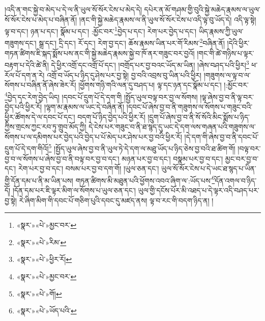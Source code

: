 །འདི་ན་གང་སྐྱེ་བ་མེད་པ་དེ་ལ་ནི་ཡུལ་སོ་སོར་ངེས་པ་མེད་དེ། དཔེར་ན་མོ་གཤམ་གྱི་བུའི་སྐྱེ་མཆེད་རྣམས་ལ་ཡུལ་སོ་སོར་ངེས་པ་མེད་པ་བཞིན་ནོ། །ནང་གི་སྐྱེ་མཆེད་རྣམས་ལ་ནི་ཡུལ་སོ་སོར་ངེས་པ་འདི་ལྟ་བུ་ཡོད་དེ། འདི་ལྟ་སྟེ། ལྟ་བ་དང་། ཉན་པ་དང་། སྣོམ་པ་དང་། :མྱོང་བར་\footnote{«སྣར་»«པེ་»མྱང་བར་}བྱེད་པ་དང་། རེག་པར་བྱེད་པ་དང་། ཡིད་རྣམས་ཀྱི་ཡུལ་གཟུགས་དང་། སྒྲ་དང་། དྲི་དང་། རོ་དང་། རེག་བྱ་དང་། ཆོས་རྣམས་ཡིན་པར་གོ་རིམས་\footnote{«སྣར་»«པེ་»རིམ་}བཞིན་ནོ། །དེའི་ཕྱིར་གཏན་ཚིགས་ཇི་སྐད་སྨོས་པས་ནང་གི་སྐྱེ་མཆེད་རྣམས་སྐྱེ་བ་ཁོ་ནར་གཟུང་བར་བྱའོ། །གང་གི་ཚེ་གཉིས་པ་ལྟར་བརྟག་པ་དེའི་ཚེ་ནི། དེ་ཕྱིར་འགྲོ་དང་འགྲོ་པོ་དང་། །བགྲོད་པར་བྱ་བའང་ཡོད་མ་ཡིན། །ཞེས་བཤད་པའི་ཕྱིར།\footnote{«སྣར་»«པེ་»ཕྱིར་རོ།} ཕ་རོལ་པོ་དག་ན་རེ། འགྲོ་བ་ཡོད་པ་ཉིད་དུ་ཤེས་པར་བྱ་སྟེ། བྱ་བའི་འབྲས་བུ་ཡིན་པའི་ཕྱིར། །གཟུགས་ལ་ལྟ་བ་ལ་སོགས་པ་བཞིན་ནོ་ཞེས་ཟེར་རོ། །ཕྱོགས་གཉི་གའི་ལན་དུ་བཤད་པ། ལྟ་དང་ཉན་དང་སྣོམ་པ་དང་། །:མྱོང་བར་\footnote{«སྣར་»«པེ་»མྱང་བར་}བྱེད་དང་རེག་བྱེད་ཡིད། །དབང་པོ་དྲུག་པོ་དེ་དག་གི །སྤྱོད་ཡུལ་བལྟ་བར་བྱ་ལ་སོགས། །ལྟ་ཞེས་བྱ་བ་ནི་ལྟ་བར་བྱེད་པའི་ཕྱིར་རོ། །ལྷག་མ་རྣམས་ལ་ཡང་དེ་བཞིན་ནོ། །དབང་པོ་ཞེས་བྱ་བ་ནི་གཟུགས་ལ་སོགས་པ་གཟུང་བའི་ཕྱིར་ཚོགས་དེ་ལ་དབང་པོ་དང་། བདག་པོ་ཉིད་བྱེད་པའི་ཕྱིར་རོ། །དྲུག་པོ་ཞེས་བྱ་བ་ནི་སོ་སོའི་མིང་སྨོས་པ་ཉིད་ཀྱིས་གྲངས་ཀྱང་རབ་ཏུ་གྲུབ་མོད་ཀྱི། དེ་ངེས་པར་གཟུང་བ་ནི་ཐ་སྙད་དུ་ཡང་དེ་དག་ལས་གཞན་པའི་གཟུགས་ལ་སོགས་པ་ལ་དམིགས་པར་བྱེད་པའི་བྱེད་པ་པོ་མེད་པར་ཤེས་པར་བྱ་བའི་ཕྱིར་རོ། །དེ་དག་གི་ཞེས་བྱ་བ་ནི་དབང་པོ་དྲུག་པོ་དེ་དག་གིའོ།\footnote{«སྣར་»«པེ་»གོ།} །སྤྱོད་ཡུལ་ཞེས་བྱ་བ་ནི་ཡུལ་ཏེ་དེ་དག་ལ་མཐུ་ཡོད་པ་ཉིད་ཅེས་བྱ་བའི་ཐ་ཚིག་གོ། །བལྟ་བར་བྱ་བ་ལ་སོགས་པ་ཞེས་བྱ་བ་ནི་བལྟ་བར་བྱ་བ་དང་། མཉན་པར་བྱ་བ་དང་། བསྣམ་པར་བྱ་བ་དང་། མྱང་བར་བྱ་བ་དང་། རེག་པར་བྱ་བ་དང་། བསམ་པར་བྱ་བ་དག་གོ། །ཡུལ་ཅན་དང་། ཡུལ་སོ་སོར་ངེས་པ་དེ་ཡང་ཐ་སྙད་པ་ཡིན་གྱི་དོན་དམ་པ་ནི་མ་ཡིན་པས། གཏན་ཚིགས་མི་མཐུན་པའི་ཕྱོགས་འབའ་ཞིག་ལ་:ཡོད་པས་\footnote{«སྣར་»«པེ་»ཡོད་པའི་}དོན་འགལ་བ་ཉིད་དོ། །དོན་དམ་པར་ཇི་ལྟར་མིག་ལ་སོགས་པ་ཡུལ་ཅན་དང་། ཡུལ་གྱི་དངོས་པོར་མི་འཐད་པ་དེ་ལྟར་འདི་བཤད་པར་བྱ་སྟེ། རེ་ཞིག་མིག་གི་དབང་པོ་གཅིག་པུའི་དབང་དུ་མཛད་ནས། ལྟ་བ་རང་གི་བདག་ཉིད་ན། །
